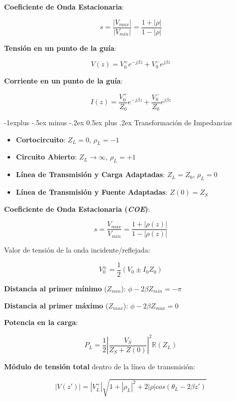 \documentclass[10pt,landscape]{article}
\makeatletter
\renewcommand{\subsection}{\@startsection{subsection}{2}{0mm}%
                                {-1explus -.5ex minus -.2ex}%
                                {0.5ex plus .2ex}%
                                {\normalfont\normalsize\bfseries}}
\makeatother
\begin{document}
\begin{multicols}{3}
\textbf{Coeficiente de Onda Estacionaria}:

\begin{equation*}
	s = \frac{|V_{max}|}{|V_{min}|} = \frac{1 + |\rho|}{1 - |\rho|}
\end{equation*}

\textbf{Tensión en un punto de la guía}:

\begin{equation*}
	V(z) = V_0^+ e^{-j \beta z} + V_0^- e^{j \beta z}
\end{equation*}

\textbf{Corriente en un punto de la guía}:

\begin{equation*}
	I(z) = \frac{V_0^+}{Z_0} e^{-j \beta z} + \frac{V_0^-}{Z_0} e^{j \beta z}	
\end{equation*}

\subsection{Transformación de Impedancias}

\begin{itemize}
	\item \textbf{Cortocircuito}: $Z_L = 0$, $\rho_L = -1$
	\item \textbf{Circuito Abierto}: $Z_L \rightarrow \infty$, $\rho_L = +1$
	\item \textbf{Línea de Transmisión y Carga Adaptadas}: $Z_L = Z_0$, $\rho_L = 0$
	\item \textbf{Línea de Transmisión y Fuente Adaptadas}: $Z(0) = Z_S$
\end{itemize}

\textbf{Coeficiente de Onda Estacionaria (\textit{COE})}:

\begin{equation*}
	s = \frac{V_{max}}{V_{min}} = \frac{1 + |\rho(z)|}{1 - |\rho(z)|}
\end{equation*}

Valor de tensión de la onda incidente/reflejada:

\begin{equation*}
	V_0^{\pm} = \frac{1}{2} (V_0 \pm I_0 Z_0)
\end{equation*}

\textbf{Distancia al primer mínimo} ($Z_{min}$): $\phi -2 \beta Z_{min} = - \pi$

\textbf{Distancia al primer máximo} ($Z_{max}$): $\phi - 2 \beta Z_{max} = 0$


\textbf{Potencia en la carga}:

\begin{equation*}
	P_L = \frac{1}{2} \left| \frac{V_S}{Z_S + Z(0)} \right|^2 \mathbb{R}(Z_L)
\end{equation*}

\textbf{Módulo de tensión total} dentro de la línea de transmisión:

\begin{equation*}
	|V(z')| = |V_L^+| \sqrt{1 + |\rho_L|^2 + 2 |\rho| cos(\theta_L - 2 \beta z')}
\end{equation*}



\end{multicols}
\end{document}
